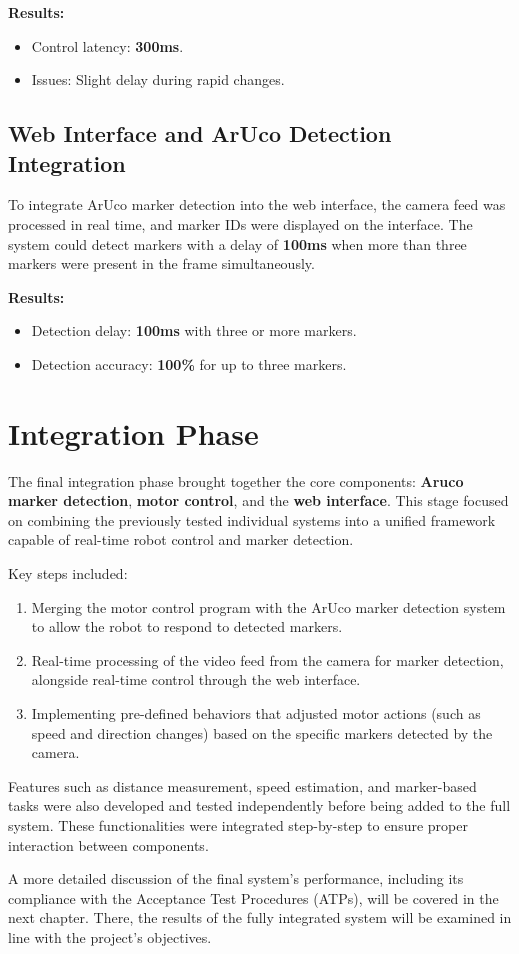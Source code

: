 \textbf{Results:}
\begin{itemize}
	\item Control latency: \textbf{300ms}.
	\item Issues: Slight delay during rapid changes.
\end{itemize}

\subsection{Web Interface and ArUco Detection Integration}

To integrate ArUco marker detection into the web interface, the camera feed was processed in real time, and marker IDs were displayed on the interface. The system could detect markers with a delay of \textbf{100ms} when more than three markers were present in the frame simultaneously.

\textbf{Results:}
\begin{itemize}
	\item Detection delay: \textbf{100ms} with three or more markers.
	\item Detection accuracy: \textbf{100\%} for up to three markers.
\end{itemize}

\section{Integration Phase}

The final integration phase brought together the core components: \textbf{Aruco marker detection}, \textbf{motor control}, and the \textbf{web interface}. This stage focused on combining the previously tested individual systems into a unified framework capable of real-time robot control and marker detection.

Key steps included:
\begin{enumerate}
	\item Merging the motor control program with the ArUco marker detection system to allow the robot to respond to detected markers.
	\item Real-time processing of the video feed from the camera for marker detection, alongside real-time control through the web interface.
	\item Implementing pre-defined behaviors that adjusted motor actions (such as speed and direction changes) based on the specific markers detected by the camera.
\end{enumerate}

Features such as distance measurement, speed estimation, and marker-based tasks were also developed and tested independently before being added to the full system. These functionalities were integrated step-by-step to ensure proper interaction between components.

A more detailed discussion of the final system’s performance, including its compliance with the Acceptance Test Procedures (ATPs), will be covered in the next chapter. There, the results of the fully integrated system will be examined in line with the project's objectives.